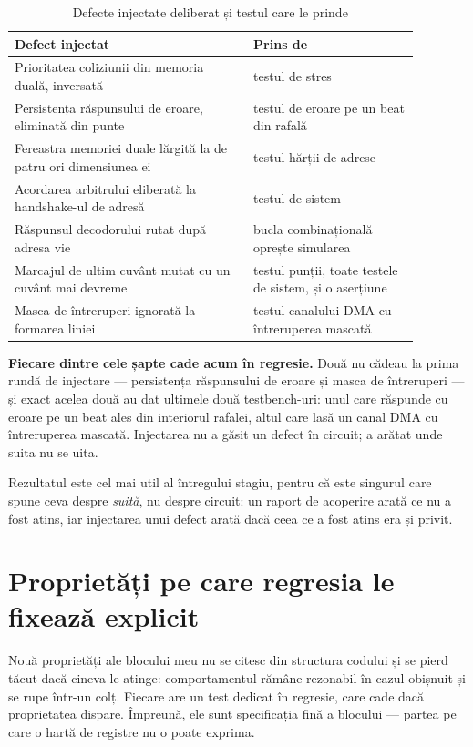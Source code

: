 \documentclass[11pt,openany]{report}
\begin{document}
\begin{table}[H]
\centering
\caption{Defecte injectate deliberat și testul care le prinde}
\label{tab:mutatii}
\small
\begin{tabular}{@{}L{0.52\linewidth}L{0.36\linewidth}@{}}
\toprule
\textbf{Defect injectat} & \textbf{Prins de} \\
\midrule
Prioritatea coliziunii din memoria duală, inversată & testul de stres \\
Persistența răspunsului de eroare, eliminată din punte & testul de eroare pe un beat din rafală \\
Fereastra memoriei duale lărgită la de patru ori dimensiunea ei & testul hărții de adrese \\
Acordarea arbitrului eliberată la handshake-ul de adresă & testul de sistem \\
Răspunsul decodorului rutat după adresa vie & bucla combinațională oprește simularea \\
Marcajul de ultim cuvânt mutat cu un cuvânt mai devreme & testul punții, toate testele de sistem, și o aserțiune \\
Masca de întreruperi ignorată la formarea liniei & testul canalului DMA cu întreruperea mascată \\
\bottomrule
\end{tabular}
\end{table}

\textbf{Fiecare dintre cele șapte cade acum în regresie.} Două nu cădeau la
prima rundă de injectare --- persistența răspunsului de eroare și masca de
întreruperi --- și exact acelea două au dat ultimele două testbench-uri: unul care
răspunde cu eroare pe un beat ales din interiorul rafalei, altul care lasă un
canal DMA cu întreruperea mascată. Injectarea nu a găsit un defect în circuit;
a arătat unde suita nu se uita.

Rezultatul este cel mai util al întregului stagiu, pentru că este singurul care
spune ceva despre \emph{suită}, nu despre circuit: un raport de acoperire arată
ce nu a fost atins, iar injectarea unui defect arată dacă ceea ce a fost atins
era și privit.

\section{Proprietăți pe care regresia le fixează explicit}
\label{sec:defecte}

Nouă proprietăți ale blocului meu nu se citesc din structura codului și se pierd
tăcut dacă cineva le atinge: comportamentul rămâne rezonabil în cazul obișnuit și
se rupe într-un colț. Fiecare are un test dedicat în regresie, care cade dacă
proprietatea dispare. Împreună, ele sunt specificația fină a blocului --- partea
pe care o hartă de registre nu o poate exprima.
\end{document}
